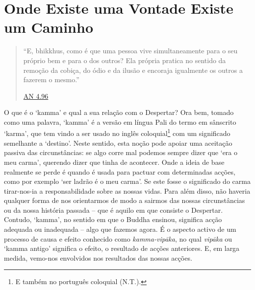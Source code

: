 
\chapter{Onde Existe uma Vontade Existe um Caminho}


\begin{quote}
  ``E, bhikkhus, como é que uma pessoa vive simultaneamente para o seu próprio
  bem e para o dos outros? Ela própria pratica no sentido da remoção da cobiça,
  do ódio e da ilusão e encoraja igualmente os outros a fazerem o mesmo.''

  \href{https://suttacentral.net/an4.96/en/thanissaro}{AN 4.96}
\end{quote}

O que é o `kamma' e qual a sua relação com o Despertar? Ora bem, tomado como uma
palavra, `kamma' é a versão em língua Pali do termo em sânscrito `karma', que
tem vindo a ser usado no inglês coloquial\footnote{E também no português
  coloquial (N.T.).} com um significado semelhante a `destino'. Neste sentido,
esta noção pode apoiar uma aceitação passiva das circunstâncias: se algo corre
mal podemos sempre dizer que `era o meu carma', querendo dizer que tinha de
acontecer. Onde a ideia de base realmente se perde é quando é usada para pactuar
com determinadas acções, como por exemplo `ser ladrão é o meu carma'. Se este
fosse o significado do carma tirar-nos-ia a responsabilidade sobre as nossas
vidas. Para além disso, não haveria qualquer forma de nos orientarmos de modo a
sairmos das nossas circunstâncias ou da nossa história passada -- que é aquilo
em que consiste o Despertar. Contudo, `kamma', no sentido em que o Buddha
ensinou, significa acção adequada ou inadequada -- algo que fazemos agora. É o
aspecto activo de um processo de causa e efeito conhecido como
\emph{kamma-vipāka}, no qual \emph{vipāka} ou `kamma antigo' significa o efeito,
o resultado de acções anteriores. E, em larga medida, vemo-nos envolvidos nos
resultados das nossas acções.

